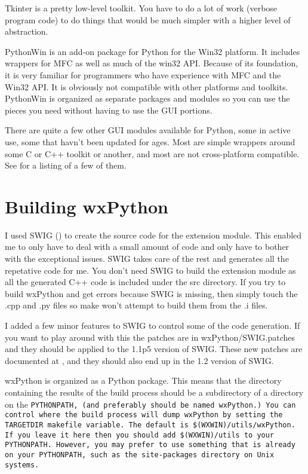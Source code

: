 Tkinter is a pretty low-level toolkit.  You have to do a lot of work
(verbose program code) to do things that would be much simpler with a higher
level of abstraction.


PythonWin is an add-on package for Python for the Win32 platform.  It
includes wrappers for MFC as well as much of the win32 API.  Because
of its foundation, it is very familiar for programmers who have
experience with MFC and the Win32 API.  It is obviously not compatible
with other platforms and toolkits.  PythonWin is organized as separate
packages and modules so you can use the pieces you need without having
to use the GUI portions.


There are quite a few other GUI modules available for Python, some in
active use, some that havn't been updated for ages.  Most are simple
wrappers around some C or C++ toolkit or another, and most are not
cross-platform compatible.  See 
for a listing of a few of them.


\section{Building wxPython}\label{wxpbuild}

I used SWIG () to
create the source code for the extension module.  This enabled me to
only have to deal with a small amount of code and only have to bother
with the exceptional issues.  SWIG takes care of the rest and
generates all the repetative code for me.  You don't need SWIG to
build the extension module as all the generated C++ code is included
under the src directory.  If you try to build wxPython and get errors
because SWIG is missing, then simply touch the .cpp and .py files so
make won't attempt to build them from the .i files.

I added a few minor features to SWIG to control some of the code
generation.  If you want to play around with this the patches are in
wxPython/SWIG.patches and they should be applied to the 1.1p5 version
of SWIG.  These new patches are documented at
,
and they should also end up in the 1.2 version of SWIG.

wxPython is organized as a Python package.  This means that the
directory containing the results of the build process should be a
subdirectory of a directory on the \tt{PYTHONPATH}, (and preferably
should be named wxPython.)  You can control where the build process
will dump wxPython by setting the \tt{TARGETDIR} makefile variable.
The default is \tt{\$(WXWIN)/utils/wxPython}.  If you leave it here
then you should add \tt{\$(WXWIN)/utils} to your \tt{PYTHONPATH}.
However, you may prefer to use something that is already on your
\tt{PYTHONPATH}, such as the \tt{site-packages} directory on Unix
 systems.


